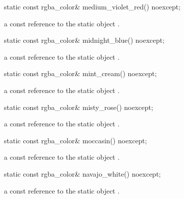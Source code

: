 \begin{itemdecl}
static const rgba_color& medium_violet_red() noexcept;
\end{itemdecl}
\begin{itemdescr}
\pnum
\returns
a const reference to the static  object .
\end{itemdescr}

\begin{itemdecl}
static const rgba_color& midnight_blue() noexcept;
\end{itemdecl}
\begin{itemdescr}
\pnum
\returns
a const reference to the static  object .
\end{itemdescr}

\begin{itemdecl}
static const rgba_color& mint_cream() noexcept;
\end{itemdecl}
\begin{itemdescr}
\pnum
\returns
a const reference to the static  object .
\end{itemdescr}

\begin{itemdecl}
static const rgba_color& misty_rose() noexcept;
\end{itemdecl}
\begin{itemdescr}
\pnum
\returns
a const reference to the static  object .
\end{itemdescr}

\begin{itemdecl}
static const rgba_color& moccasin() noexcept;
\end{itemdecl}
\begin{itemdescr}
\pnum
\returns
a const reference to the static  object .
\end{itemdescr}

\begin{itemdecl}
static const rgba_color& navajo_white() noexcept;
\end{itemdecl}
\begin{itemdescr}
\pnum
\returns
a const reference to the static  object .
\end{itemdescr}

